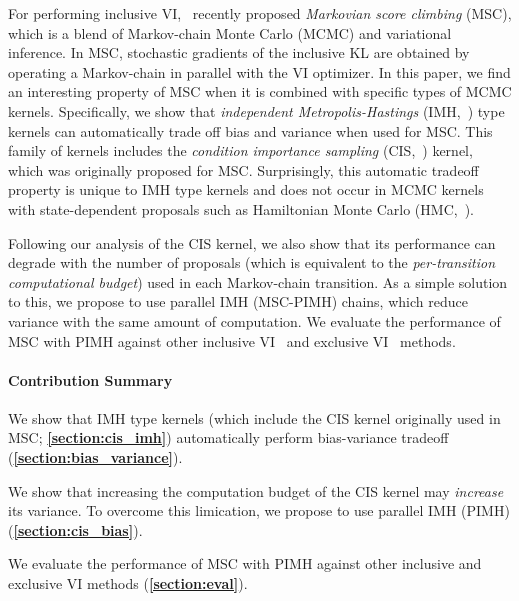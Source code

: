 For performing inclusive VI,~\citet{NEURIPS2020_b2070693, pmlr-v124-ou20a} recently proposed \textit{Markovian score climbing} (MSC), which is a blend of Markov-chain Monte Carlo (MCMC) and variational inference.
In MSC, stochastic gradients of the inclusive KL are obtained by operating a Markov-chain in parallel with the VI optimizer.
In this paper, we find an interesting property of MSC when it is combined with specific types of MCMC kernels.
Specifically, we show that \textit{independent Metropolis-Hastings} (IMH,~\citealt{robert_monte_2004}) type kernels can automatically trade off bias and variance when used for MSC.
This family of kernels includes the \textit{condition importance sampling} (CIS,~\citealt{NEURIPS2020_b2070693}) kernel, which was originally proposed for MSC.
Surprisingly, this automatic tradeoff property is unique to IMH type kernels and does not occur in MCMC kernels with state-dependent proposals such as Hamiltonian Monte Carlo (HMC,~\citealt{duane_hybrid_1987, neal_mcmc_2011, betancourt_conceptual_2017}).

Following our analysis of the CIS kernel, we also show that its performance can degrade with the number of proposals (which is equivalent to the \textit{per-transition computational budget}) used in each Markov-chain transition.
As a simple solution to this, we propose to use parallel IMH (MSC-PIMH) chains, which reduce variance with the same amount of computation.
We evaluate the performance of MSC with PIMH against other inclusive VI~\citep{DBLP:journals/corr/BornscheinB14, NEURIPS2020_b2070693} and exclusive VI~\citep{pmlr-v33-ranganath14, JMLR:v18:16-107} methods.

\vspace{-0.1in}
\paragraph{Contribution Summary}
\begin{enumerate*}[label=\textbf{(\roman*)}]
\item We show that IMH type kernels (which include the CIS kernel originally used in MSC; \textbf{\cref{section:cis_imh}}) automatically perform bias-variance tradeoff (\textbf{\cref{section:bias_variance}}).
\item We show that increasing the computation budget of the CIS kernel may \textit{increase} its variance.
  To overcome this limication, we propose to use parallel IMH (PIMH) (\textbf{\cref{section:cis_bias}}).
\item We evaluate the performance of MSC with PIMH against other inclusive and exclusive VI methods (\textbf{\cref{section:eval}}).
\end{enumerate*}

